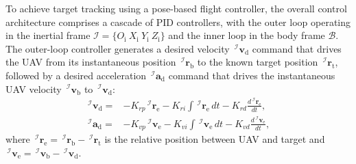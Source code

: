\documentclass[10pt,journal]{IEEEtran}
\begin{document}
To achieve target tracking using a pose-based flight controller, the overall control architecture comprises a cascade of PID controllers, with the outer loop operating in the inertial frame $\mathcal{I}=\{O_{\text{i}}~X_{\text{i}}~Y_{\text{i}}~Z_{\text{i}}\}$ and the inner loop in the body frame $\mathcal{B}$. The outer-loop controller generates a desired velocity $\,^\mathcal{I}\boldsymbol{v}_{\text{d}}$ command that drives the UAV from its instantaneous position $\,^\mathcal{I}\boldsymbol{r}_{\text{b}}$ to the known target position $\,^\mathcal{I}\boldsymbol{r}_{\text{t}}$, followed by a desired acceleration $\,^\mathcal{I}\boldsymbol{a}_{\text{d}}$ command that drives the instantaneous UAV velocity $\,^\mathcal{I}\boldsymbol{v}_{\text{b}}$ to $\,^\mathcal{I}\boldsymbol{v}_{\text{d}}$:
\begin{align} \label{sup:outer_loop_control}
    \,^\mathcal{I}\boldsymbol{v}_{\text{d}} =& - K_{rp} \,^\mathcal{I}\boldsymbol{r}_{\text{e}} - K_{ri} \int \,^\mathcal{I}\boldsymbol{r}_{\text{e}}\, dt - K_{rd} \frac{d\,^\mathcal{I}\boldsymbol{r}_{\text{e}}}{dt}, \nonumber \\
    \,^\mathcal{I}\boldsymbol{a}_{\text{d}} =& - K_{vp} \,^\mathcal{I}\boldsymbol{v}_{\text{e}} - K_{vi} \int \,^\mathcal{I}\boldsymbol{v}_{\text{e}}\, dt - K_{vd} \frac{d\,^\mathcal{I}\boldsymbol{v}_{\text{e}}}{dt},
\end{align}
where $\,^\mathcal{I}\boldsymbol{r}_{\text{e}} = \,^\mathcal{I}\boldsymbol{r}_{\text{b}} - \,^\mathcal{I}\boldsymbol{r}_{\text{t}}$ is the relative position between UAV and target and $\,^\mathcal{I}\boldsymbol{v}_{\text{e}} = \,^\mathcal{I}\boldsymbol{v}_{\text{b}} - \,^\mathcal{I}\boldsymbol{v}_{\text{d}}$.
\end{document}
